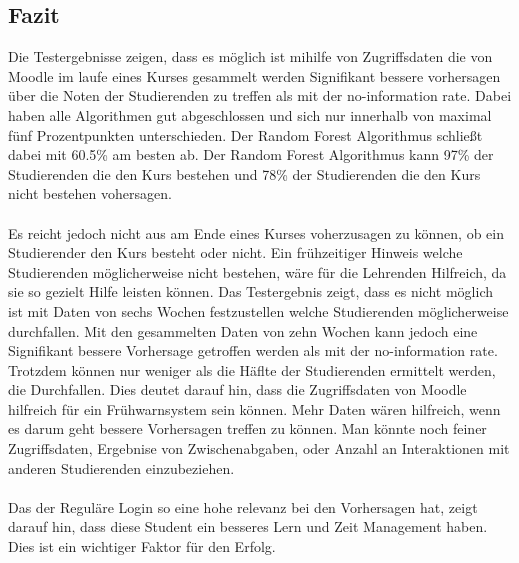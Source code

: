 \subsection{Fazit}
Die Testergebnisse zeigen, dass es möglich ist mihilfe von Zugriffsdaten die von Moodle im laufe eines Kurses gesammelt werden Signifikant bessere vorhersagen über die Noten der Studierenden zu treffen als mit der \glqq no-information rate\grqq{}.
Dabei haben alle Algorithmen gut abgeschlossen und sich nur innerhalb von maximal fünf Prozentpunkten unterschieden. Der Random Forest Algorithmus schließt dabei mit 60.5\% am besten ab.
Der Random Forest Algorithmus kann 97\% der Studierenden die den Kurs bestehen und 78\% der Studierenden die den Kurs nicht bestehen vohersagen. \cite[S. 14]{Quinn.2020}
\\ \noindent \\ \noindent
Es reicht jedoch nicht aus am Ende eines Kurses voherzusagen zu können, ob ein Studierender den Kurs besteht oder nicht.
Ein frühzeitiger Hinweis welche Studierenden möglicherweise nicht bestehen, wäre für die Lehrenden Hilfreich, da sie so gezielt Hilfe leisten können.
Das Testergebnis zeigt, dass es nicht möglich ist mit Daten von sechs Wochen festzustellen welche Studierenden möglicherweise durchfallen.
Mit den gesammelten Daten von zehn Wochen kann jedoch eine Signifikant bessere Vorhersage getroffen werden als mit der \glqq no-information rate\grqq{}.
Trotzdem können nur weniger als die Häflte der Studierenden ermittelt werden, die Durchfallen.
Dies deutet darauf hin, dass die Zugriffsdaten von Moodle hilfreich für ein Frühwarnsystem sein können.
Mehr Daten wären hilfreich, wenn es darum geht bessere Vorhersagen treffen zu können. Man könnte noch feiner Zugriffsdaten, Ergebnise von Zwischenabgaben, oder Anzahl an Interaktionen mit anderen Studierenden einzubeziehen. \cite[S. 14ff]{Quinn.2020}
\\ \noindent \\ \noindent
Das der Reguläre Login so eine hohe relevanz bei den Vorhersagen hat, zeigt darauf hin, dass diese Student ein besseres Lern und Zeit Management haben. Dies ist ein wichtiger Faktor für den Erfolg. \cite[S. 15f]{Quinn.2020}